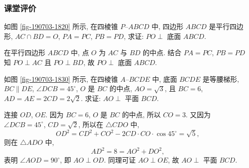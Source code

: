 \subsubsection{课堂评价}
\begin{exercise}
    如图 \ref{fig-190703-1820} 所示, 在四棱锥 $P\text{--}ABCD$ 中, 四边形 $ABCD$ 是平行四边形, $AC\cap BD=O$, $PA=PC$, $PB=PD$, 求证: $PO\perp$ 底面 $ABCD$.
\end{exercise}
\beginsolution
    在平行四边形 $ABCD$ 中, 点 $O$ 为 $AC$ 与 $BD$ 的中点. 结合 $PA=PC$, $PB=PD$ 知 $PO\perp AC$ 且 $PO\perp BD$, 故 $PO\perp$ 底面 $ABCD$.
\endsolution

\begin{exercise}
    如图 \ref{fig-190703-1830} 所示, 在四棱锥 $A\text{--}BCDE$ 中, 底面 $BCDE$ 是等腰梯形, $BC\parallel DE$, $\angle DCB=45^\circ$, $O$ 是 $BC$ 的中点, $AO=\sqrt3$, 且 $BC=6$, $AD=AE=2CD=2\sqrt2$. 求证: $AO\perp$ 平面 $BCD$.
\end{exercise}
\beginsolution
    连接 $OD$, $OE$. 因为 $BC=6$, $O$ 是 $BC$ 的中点, 所以 $CO=3$. 又因为 $\angle DCB= 45^\circ$, $CD=\sqrt2$, 所以在 $\triangle CDO$ 中,
    \[OD^2= CD^2+CO^2- 2CD\cdot CO\cdot \cos45^\circ
        = \sqrt5,\]
    则在 $\triangle ADO$ 中,
    \[AD^2= 8= AO^2+ DO^2,\]
    表明 $\angle AOD= 90^\circ$, 即 $AO\perp OD$. 同理可证 $AO\perp OE$, 故 $AO\perp$ 平面 $BCD$.
\endsolution

